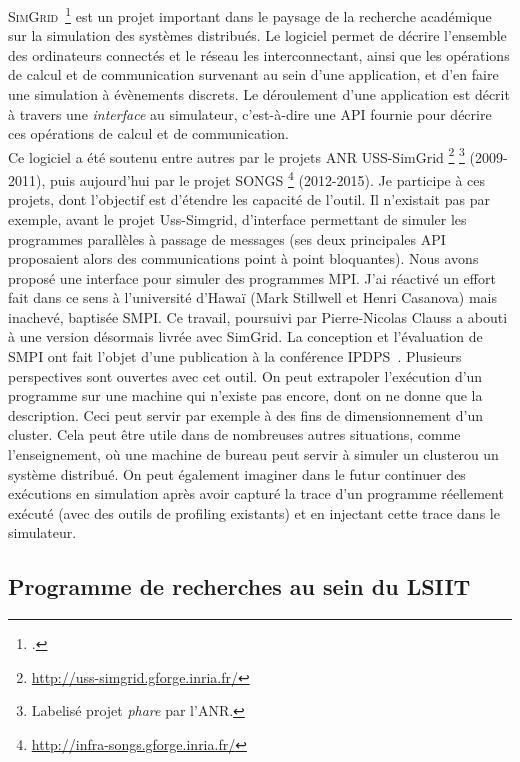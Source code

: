 \documentclass[11pt]{article}
\begin{document}
\textsc{SimGrid}~\footcite{Casanova08} est un projet important dans le paysage 
de la recherche académique sur la simulation des systèmes distribués. Le 
logiciel permet de décrire l'ensemble des ordinateurs connectés et le réseau 
les interconnectant, ainsi que les opérations de calcul et de communication 
survenant au sein d'une application, et d'en faire une simulation à évènements 
discrets. Le déroulement d'une application est décrit à travers une 
\emph{interface} au simulateur, c'est-à-dire une API fournie pour décrire ces 
opérations de calcul et de communication.\\

Ce logiciel a été soutenu entre autres par le projets ANR USS-SimGrid%
\footnote{\url{http://uss-simgrid.gforge.inria.fr/}} 
\footnote{Labelisé projet \textit{phare} par l'ANR.}
(2009-2011), puis aujourd'hui par le projet SONGS%
\footnote{\url{http://infra-songs.gforge.inria.fr/}} 
(2012-2015). Je participe à ces projets, dont l'objectif est d'étendre les 
capacité de l'outil. Il n'existait pas par exemple, avant le projet Uss-Simgrid,  
d'interface permettant de simuler les programmes parallèles à passage de 
messages (ses deux principales API proposaient alors des communications point à 
point bloquantes). Nous avons proposé une interface pour simuler des programmes 
MPI. J'ai réactivé un effort fait dans ce sens à l'université d'Hawaï (Mark 
Stillwell et Henri Casanova) mais inachevé, baptisée SMPI. Ce travail, poursuivi 
par Pierre-Nicolas Clauss a abouti à une version désormais livrée avec SimGrid. 
La conception et l'évaluation de SMPI ont fait l'objet d'une publication à la 
conférence IPDPS~\cite{icps-2011-224}. Plusieurs perspectives sont ouvertes avec 
cet outil. On peut extrapoler l'exécution d'un programme sur une machine qui 
n'existe pas encore, dont on ne donne que la description. Ceci peut servir par 
exemple à des fins de dimensionnement d'un cluster. Cela peut être utile dans 
de nombreuses autres situations, comme l'enseignement, où une machine de bureau 
peut servir à simuler un clusterou un système distribué. On peut également 
imaginer dans le futur continuer des exécutions en simulation après avoir 
capturé la trace d'un programme réellement exécuté (avec des outils de 
profiling existants) et en injectant cette trace dans le simulateur.


\subsection{Programme de recherches au sein du LSIIT}
\end{document}
